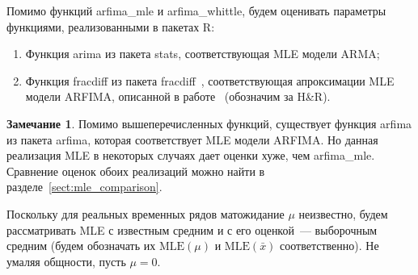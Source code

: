 \documentclass[specialist,
substylefile = spbu_report.rtx,
subf,href,colorlinks=true, 12pt]{disser}
\theoremstyle{definition}
\newtheorem{remark}{Замечание}[section]
\begin{document}
Помимо функций \textsf{arfima\_mle} и \textsf{arfima\_whittle}, будем оценивать параметры функциями, реализованными в пакетах \textsf{R}:
\begin{enumerate}
	\item Функция \textsf{arima} из пакета \textsf{stats}, соответствующая MLE модели ARMA;
	\item Функция \textsf{fracdiff} из пакета \textsf{fracdiff}~\cite{Maechler1999}, соответствующая апроксимации MLE модели ARFIMA, описанной в работе~\cite{Haslett1989} (обозначим за H\&R).
\end{enumerate}
\begin{remark}
	Помимо вышеперечисленных функций, существует функция \textsf{arfima} из пакета \textsf{arfima}, которая соответствует MLE модели ARFIMA. Но данная реализация MLE в некоторых случаях дает оценки хуже, чем \textsf{arfima\_mle}. Сравнение оценок обоих реализаций можно найти в разделе~\ref{sect:mle_comparison}.
\end{remark}
Поскольку для реальных временных рядов матожидание $\mu$ неизвестно, будем рассматривать MLE с известным средним и с его оценкой~--- выборочным средним (будем обозначать их $\mathrm{MLE}(\mu)$ и $\mathrm{MLE}(\bar x)$ соответственно). Не умаляя общности, пусть $\mu=0$.
\end{document}
